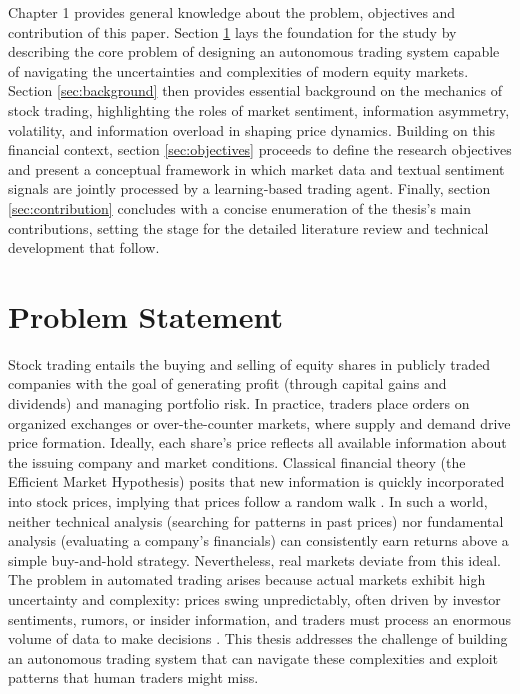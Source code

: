 Chapter 1 provides general knowledge about the problem, objectives and contribution of this paper. Section \ref{sec:problem} lays the foundation for the study by describing the core problem of designing an autonomous trading system capable of navigating the uncertainties and complexities of modern equity markets. Section \ref{sec:background} then provides essential background on the mechanics of stock trading, highlighting the roles of market sentiment, information asymmetry, volatility, and information overload in shaping price dynamics. Building on this financial context, section \ref{sec:objectives}  proceeds to define the research objectives and present a conceptual framework in which market data and textual sentiment signals are jointly processed by a learning‐based trading agent. Finally, section \ref{sec:contribution} concludes with a concise enumeration of the thesis’s main contributions, setting the stage for the detailed literature review and technical development that follow.

\section{Problem Statement}
\label{sec:problem}
Stock trading entails the buying and selling of equity shares in publicly traded companies with the goal of generating profit (through capital gains and dividends) and managing portfolio risk. In practice, traders place orders on organized exchanges or over-the-counter markets, where supply and demand drive price formation. Ideally, each share’s price reflects all available information about the issuing company and market conditions. Classical financial theory (the Efficient Market Hypothesis) posits that new information is quickly incorporated into stock prices, implying that prices follow a random walk \cite{Malkiel2003}. In such a world, neither technical analysis (searching for patterns in past prices) nor fundamental analysis (evaluating a company’s financials) can consistently earn returns above a simple buy-and-hold strategy. Nevertheless, real markets deviate from this ideal. The problem in automated trading arises because actual markets exhibit high uncertainty and complexity: prices swing unpredictably, often driven by investor sentiments, rumors, or insider information, and traders must process an enormous volume of data to make decisions \cite{Kyle1985, Malkiel2003, Kahneman2011, Ivashina2011}. This thesis addresses the challenge of building an autonomous trading system that can navigate these complexities and exploit patterns that human traders might miss.

